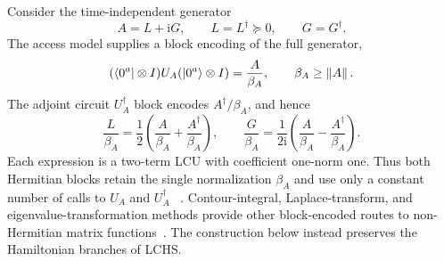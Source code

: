 \documentclass[aps,pra,reprint,floatfix,unsortedaddress,superscriptaddress]{revtex4-2}
\newcommand{\norm}[1]{\left\lVert#1\right\rVert}
\begin{document}
Consider the time-independent generator
\begin{equation}
    A=L+\mathrm iG,
    \qquad
    L=L^\dagger\succeq0,
    \qquad
    G=G^\dagger.
    \label{eq:cartesian_decomposition}
\end{equation}
The access model supplies a block encoding of the full generator,
\begin{equation}
    (\bra{0^a}\otimes I)U_A(\ket{0^a}\otimes I)
    =\frac{A}{\beta_A},
    \qquad
    \beta_A\geq\norm{A}.
    \label{eq:nonhermitian_access}
\end{equation}
The adjoint circuit $U_A^\dagger$ block encodes
$A^\dagger/\beta_A$, and hence
\begin{equation}
    \frac{L}{\beta_A}
    =\frac12\left(\frac{A}{\beta_A}
    +\frac{A^\dagger}{\beta_A}\right),
    \qquad
    \frac{G}{\beta_A}
    =\frac{1}{2\mathrm i}\left(\frac{A}{\beta_A}
    -\frac{A^\dagger}{\beta_A}\right).
    \label{eq:cartesian_block_encodings}
\end{equation}
Each expression is a two-term LCU with coefficient one-norm one.
Thus both Hermitian blocks retain the single normalization $\beta_A$
and use only a constant number of calls to $U_A$ and $U_A^\dagger$
~\cite{Childs2012lcu,Gilyen2019qsvt,
dong2025productsblockencodings}.
Contour-integral, Laplace-transform, and eigenvalue-transformation
methods provide other block-encoded routes to non-Hermitian matrix
functions~\cite{Takahira_2020,takahira2021quantumalgorithmsbasedblockencoding,
jiang2026contourintegralbasedquantumeigenvalue,10756112,
an2024laplacetransformbasedquantum,chan2023simulatingnonunitarydynamicsusing,
wang2025quantumsimulationnonunitarydynamics}.  The construction below
instead preserves the Hamiltonian branches of LCHS\@.
\end{document}
